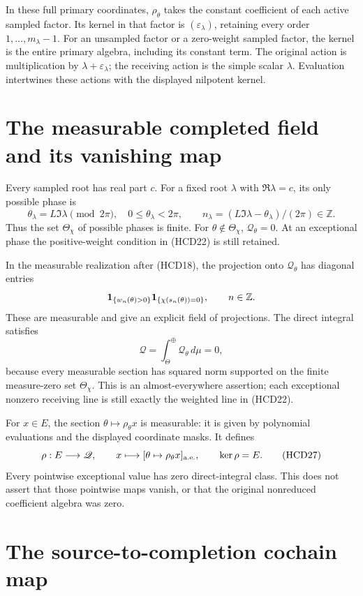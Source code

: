 In these full primary coordinates, $\rho_\theta$ takes
the constant coefficient of each active sampled factor.
Its kernel in that factor is $(\varepsilon_\lambda)$,
retaining every order $1,\ldots,m_\lambda-1$.
For an unsampled factor or a zero-weight sampled factor,
the kernel is the entire primary algebra, including
its constant term. The original action is multiplication
by $\lambda+\varepsilon_\lambda$; the receiving action
is the simple scalar $\lambda$. Evaluation intertwines
these actions with the displayed nilpotent kernel.

\section{The measurable completed field and its vanishing map}

Every sampled root has real part $c$. For a fixed root $\lambda$
with $\Re\lambda=c$, its only possible phase is
\[
 \theta_\lambda=L\Im\lambda\pmod{2\pi},\quad
 0\le\theta_\lambda<2\pi,\qquad
 n_\lambda=(L\Im\lambda-\theta_\lambda)/(2\pi)\in\mathbb Z.
\]
Thus the set $\Theta_\chi$ of possible phases is finite.
For $\theta\notin\Theta_\chi$, $\mathcal Q_\theta=0$.
At an exceptional phase the positive-weight condition
in (HCD22) is still retained.

In the measurable realization after (HCD18), the projection
onto $\mathcal Q_\theta$ has diagonal entries
\[
 {\bf1}_{\{w_n(\theta)>0\}}
 {\bf1}_{\{\chi(s_n(\theta))=0\}},\qquad n\in\mathbb Z.
\]
These are measurable and give an explicit field of projections.
The direct integral satisfies
\[
 \mathscr Q=\int_\Theta^\oplus\mathcal Q_\theta\,d\mu=0,
 \tag{HCD26}
\]
because every measurable section has squared norm supported
on the finite measure-zero set $\Theta_\chi$.
This is an almost-everywhere assertion; each exceptional
nonzero receiving line is still exactly the weighted line
in (HCD22).

For $x\in E$, the section $\theta\mapsto\rho_\theta x$
is measurable: it is given by polynomial evaluations and
the displayed coordinate masks. It defines
\[
 \rho:E\longrightarrow\mathscr Q,\qquad
 x\longmapsto[\theta\mapsto\rho_\theta x]_{\rm a.e.},
 \qquad \ker\rho=E.
 \tag{HCD27}
\]
Every pointwise exceptional value has zero direct-integral
class. This does not assert that those pointwise maps vanish,
or that the original nonreduced coefficient algebra was zero.

\section{The source-to-completion cochain map}

